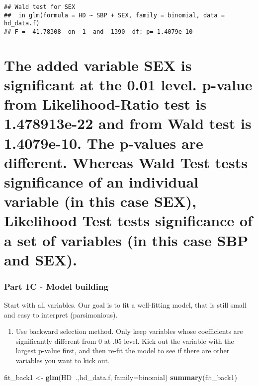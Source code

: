 \documentclass[]{article}
\newenvironment{Shaded}{\begin{snugshade}}{\end{snugshade}}
\newcommand{\KeywordTok}[1]{\textcolor[rgb]{0.13,0.29,0.53}{\textbf{#1}}}
\newcommand{\DataTypeTok}[1]{\textcolor[rgb]{0.13,0.29,0.53}{#1}}
\newcommand{\StringTok}[1]{\textcolor[rgb]{0.31,0.60,0.02}{#1}}
\newcommand{\OperatorTok}[1]{\textcolor[rgb]{0.81,0.36,0.00}{\textbf{#1}}}
\newcommand{\NormalTok}[1]{#1}
\providecommand{\tightlist}{%
  \setlength{\itemsep}{0pt}\setlength{\parskip}{0pt}}
\begin{document}
\begin{verbatim}
## Wald test for SEX
##  in glm(formula = HD ~ SBP + SEX, family = binomial, data = hd_data.f)
## F =  41.78308  on  1  and  1390  df: p= 1.4079e-10
\end{verbatim}

\section{The added variable SEX is significant at the 0.01 level.
p-value from Likelihood-Ratio test is 1.478913e-22 and from Wald test is
1.4079e-10. The p-values are different. Whereas Wald Test tests
significance of an individual variable (in this case SEX), Likelihood
Test tests significance of a set of variables (in this case SBP and
SEX).}\label{the-added-variable-sex-is-significant-at-the-0.01-level.-p-value-from-likelihood-ratio-test-is-1.478913e-22-and-from-wald-test-is-1.4079e-10.-the-p-values-are-different.-whereas-wald-test-tests-significance-of-an-individual-variable-in-this-case-sex-likelihood-test-tests-significance-of-a-set-of-variables-in-this-case-sbp-and-sex.}

\subsubsection{Part 1C - Model building}\label{part-1c---model-building}

Start with all variables. Our goal is to fit a well-fitting model, that
is still small and easy to interpret (parsimonious).

\begin{enumerate}
\def\labelenumi{\roman{enumi}.}
\tightlist
\item
  Use backward selection method. Only keep variables whose coefficients
  are significantly different from 0 at .05 level. Kick out the variable
  with the largest p-value first, and then re-fit the model to see if
  there are other variables you want to kick out.
\end{enumerate}

\begin{Shaded}
\begin{Highlighting}[]
\NormalTok{fit_back1 <-}\StringTok{ }\KeywordTok{glm}\NormalTok{(HD}\OperatorTok{~}\NormalTok{.,hd_data.f, }\DataTypeTok{family=}\NormalTok{binomial)}
\KeywordTok{summary}\NormalTok{(fit_back1)}
\end{Highlighting}
\end{Shaded}
\end{document}
